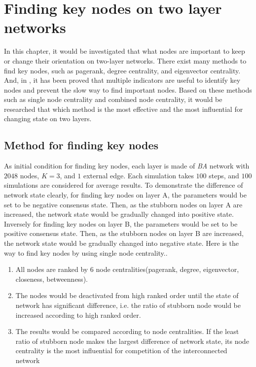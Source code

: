 
\chapter{Finding key nodes on two layer networks}
\label{chap:finding key nodes on two layer networks}
In this chapter, it would be investigated that what nodes are important to keep or change their orientation on two-layer networks. There exist many methods to find key nodes, such as pagerank, degree centrality, and eigenvector centrality. And, in \parencite{mesgari2015, huang2014}, it has been proved that multiple indicators are useful to identify key nodes and prevent the slow way to find important nodes. Based on these methods such as single node centrality and combined node centrality, it would be researched that which method is the most effective and the most influential for changing state on two layers.  

\section{Method for finding key nodes}
\label{sec:method for finding key nodes}
As initial condition for finding key nodes, each layer is made of \textit{BA} network with $2048$ nodes, $K=3$, and $1$ external edge. Each simulation takes $100$ steps, and $100$ simulations are considered for average results. To demonstrate the difference of network state clearly, for finding key nodes on layer A, the parameters would be set to be negative consensus state. Then, as the stubborn nodes on layer A are increased, the network state would be gradually changed into positive state.  Inversely for finding key nodes on layer B, the parameters would be set to be positive consensus state. Then, as the stubborn nodes on layer B are increased, the network state would be gradually changed into negative state.
Here is the way to find key nodes by using single node centrality..
\begin{enumerate}
	\item All nodes are ranked by 6 node centralities(pagerank, degree, eigenvector, closeness, betweenness).
	\item The nodes would be deactivated from high ranked order until the state of network has significant difference, i.e. the ratio of stubborn node would be increased according to high ranked order. 
	\item The results would be compared according to node centralities. If the least ratio of stubborn node makes the largest difference of network state, its node centrality is the most influential for competition of the interconnected network
\end{enumerate}

